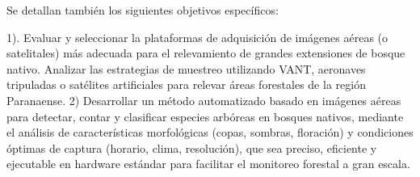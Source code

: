 Se detallan también los siguientes objetivos específicos:

 1). Evaluar y seleccionar la plataformas de adquisición de imágenes aéreas (o satelitales) más adecuada para el relevamiento de grandes extensiones de bosque nativo. Analizar las estrategias de muestreo utilizando VANT, aeronaves tripuladas o satélites artificiales para relevar áreas forestales de la región Paranaense.
2) Desarrollar un método automatizado basado en imágenes aéreas para detectar, contar y clasificar especies arbóreas en bosques nativos, mediante el análisis de características morfológicas (copas, sombras, floración) y condiciones óptimas de captura (horario, clima, resolución), que sea preciso, eficiente y ejecutable en hardware estándar para facilitar el monitoreo forestal a gran escala.
